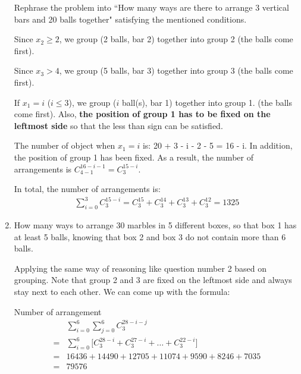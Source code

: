 \documentclass[10pt]{article}
\newcounter{problem}
\begin{document}
\begin{enumerate}
    \par Rephrase the problem into ``How many ways are there to arrange 3 vertical bars and 20 balls
        together" satisfying the mentioned conditions.
    \par Since $x_{2} \geq 2$, we group (2 balls, bar 2) together into group 2 (the balls come first).
    \par Since $x_{3} > 4$, we group (5 balls, bar 3) together into group 3 (the balls come first).
    \par If $x_{1} = i$ ($i \leq 3$), we group ($i$ ball(s), bar 1) together into group 1. (the
        balls come first). Also, \textbf{the position of group 1 has to be fixed on the leftmost
        side} so that the less than sign can be satisfied.
    \par The number of object when $x_{1} = i$ is: 20 + 3 - i - 2 - 5 = 16 - i. In addition, the
        position of group 1 has been fixed. As a result, the number of arrangements is
        $C_{4 - 1}^{16 - i - 1} = C_{3}^{15 - i} $. 
    \par In total, the number of arrangements is:
    \begin{align*}
        \sum_{i = 0}^{3} C_{3}^{15 - i} = C_{3}^{15} + C_{3}^{14} + C_{3}^{13} + C_{3}^{12} = 1325
    \end{align*}

    \item How many ways to arrange 30 marbles in 5 different boxes, so that box 1 has at least 5
        balls, knowing that box 2 and box 3 do not contain more than 6 balls.

    \par Applying the same way of reasoning like question number 2 based on grouping.
        Note that group 2 and 3 are fixed on the leftmost side and always stay next to each other.
        We can come up with the formula:
    \par Number of arrangement
    \begin{align*}
        & \sum_{i = 0}^{6} \sum_{j = 0}^{6} C_{3}^{28 - i - j} \\
        = & \sum_{i = 0}^{6} \bigg[ C_{3}^{28 - i} + C_{3}^{27 - i} + \ldots
        + C_{3}^{22 - i} \bigg] \\
        = & 16436 + 14490 + 12705 + 11074 + 9590 + 8246 + 7035 \\
        = & 79576
    \end{align*}

\end{enumerate}
\end{document}
